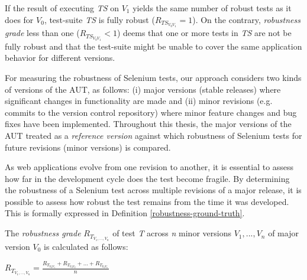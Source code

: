 If the result of executing \textit{TS} on \textit{$V_{1}$} yields the same number of robust tests as it does for \textit{$V_{0}$}, test-suite \textit{TS} is fully robust ($R_{TS_{V_{0}V_{1}}} =1$). On the contrary, \textit{
robustness grade} less than one ($R_{TS_{V_{0}V_{1}}} < 1$) deems that one or more tests in \textit{TS} are not be fully robust and that the test-suite might be unable to cover the same application behavior for different versions. 

For measuring the robustness of Selenium tests, our approach considers two kinds of versions of the AUT, as follows: (i) major versions (stable releases) where significant changes in functionality are made and (ii) minor revisions (e.g. commits to the version control repository) where minor feature changes and bug fixes have been implemented. Throughout this thesis, the major versions of the AUT treated as a \textit{reference version} against which robustness of Selenium tests for future revisions (minor versions) is compared. 


As web applications evolve from one revision to another, it is essential to assess how far in the development cycle does the test become fragile. By determining the robustness of a Selenium test across multiple revisions of a major release, it is possible to assess how robust the test remains from the time it was developed. This is formally expressed in Definition \ref{robustness-ground-truth}. 

\theoremstyle{definition}

\begin{definition}{The \textit{
robustness grade} ${R_{T_{V_1,...,V_n}}}$ of test \textit{T} across \textit{n} minor versions \textit{$V_1,...,V_n$} of major version \textit{$V_{0}$} is calculated as follows:}
\begin{center}
\vspace{0.5cm}
${R_{T_{V_1,...,V_n}}} = \displaystyle \frac{R_{T_{V_{0}V_{1}}} + R_{T_{V_{0}V_{2}}} + ... + R_{T_{V_{0}V_{n}}}}{n}$ \normalsize
\newline
\newline
\newline
\end{center}
\label{robustness-ground-truth}  
\end{definition} 

